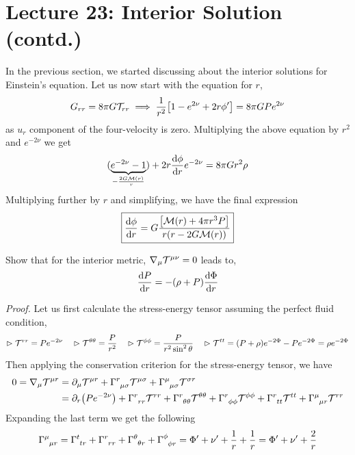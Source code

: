 \section*{Lecture 23: Interior Solution (contd.)}
In the previous section, we started discussing about the interior solutions for Einstein's equation. Let us now start with the equation for $r$,
$$G_{rr} = 8\pi G \mathcal T_{rr} \implies \frac{1}{r^2}\qty[1 - e^{2\nu} + 2r\phi' ] = 8\pi G P e^{2\nu}$$
as $u_{r}$ component of the four-velocity is zero. Multiplying the above equation by $r^2$ and $e^{-2\nu}$ we get
$$(\underbrace{e^{-2\nu}-1}_{-\frac{2G\mathcal M(r)}{r}}) + 2r\dv{\phi}{r} e^{-2\nu} = 8\pi G r^2\rho$$
Multiplying further by $r$ and simplifying, we have the final expression
\begin{equation}\label{eqn:TOV2}
    \boxed{\dv{\phi}{r} = G\frac{\qty[\mathcal M(r)+4\pi r^3P]}{r(r-2G\mathcal M(r))}}
\end{equation}
\begin{tcolorbox}[colframe=black, colback=lime!20!white, boxrule=1.5pt, arc=4pt]
Show that for the interior metric, $\nabla_\mu \mathcal T^{\mu\nu} = 0$ leads to,
\begin{equation}\label{eqn:TOV3}
    \dv{P}{r} = -(\rho+P)\dv{\Phi}{r}
\end{equation}
\end{tcolorbox}
\noindent
\textit{Proof.} Let us first calculate the stress-energy tensor assuming the perfect fluid condition,
$$\vartriangleright\mathcal T^{rr} = Pe^{-2\nu}\quad \vartriangleright \mathcal T^{\theta\theta} = \frac{P}{r^2}\quad \vartriangleright \mathcal T^{\phi\phi} = \frac{P}{r^2\sin^2\theta} \quad \vartriangleright \mathcal T^{tt} = (P+\rho)e^{-2\Phi} -Pe^{-2\Phi} = \rho e^{-2\Phi}$$
Then applying the conservation criterion for the stress-energy tensor, we have
\begin{align*}
    0 = \nabla_\mu \ST^{\mu r} &= \partial_\mu\ST^{\mu r} + \chris{r}{\mu}{\sigma}\ST^{\mu\sigma} + \chris{\mu}{\mu}{\sigma}\ST^{\sigma r}\\
    &=\partial_r \qty(Pe^{-2\nu}) + \chris{r}{r}{r}\ST^{rr}+\chris{r}{\theta}{\theta}\ST^{\theta\theta}+\chris{r}{\phi}{\phi}\ST^{\phi\phi}+\chris{r}{t}{t}\ST^{tt}+\chris{\mu}{\mu}{r}\ST^{rr}
\end{align*}
Expanding the last term we get the following
$$\chris{\mu}{\mu}{r} = \chris{t}{t}{r} +\chris{r}{r}{r}+\chris{\theta}{\theta}{r} +\chris{\phi}{\phi}{r} = \Phi' + \nu'+\frac{1}{r}+\frac{1}{r} =    \Phi' + \nu'+\frac{2}{r}$$
